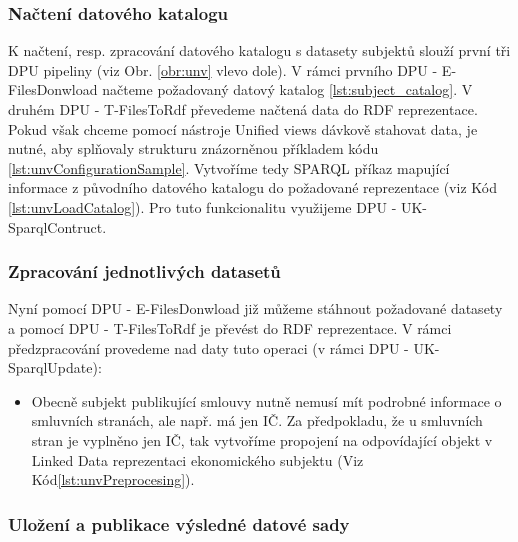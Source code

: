 \subsubsection*{Načtení datového katalogu}

K načtení, resp. zpracování datového katalogu s datasety subjektů slouží první tři DPU pipeliny (viz Obr. \ref{obr:unv} vlevo dole). V rámci prvního DPU - E-FilesDonwload načteme požadovaný datový katalog \ref{lst:subject_catalog}. V druhém DPU - T-FilesToRdf převedeme načtená data do RDF reprezentace. Pokud však chceme pomocí nástroje Unified views dávkově stahovat data, je nutné, aby splňovaly strukturu znázorněnou příkladem kódu \ref{lst:unvConfigurationSample}. Vytvoříme tedy SPARQL příkaz mapující informace z původního datového katalogu do požadované reprezentace (viz Kód \ref{lst:unvLoadCatalog}). Pro tuto funkcionalitu využijeme DPU - UK-SparqlContruct.





\subsubsection*{Zpracování jednotlivých datasetů}

Nyní pomocí DPU - E-FilesDonwload již můžeme stáhnout požadované datasety a pomocí DPU - T-FilesToRdf je převést do RDF reprezentace. V rámci předzpracování provedeme nad daty tuto operaci (v rámci DPU - UK-SparqlUpdate):

\begin{itemize}
\item Obecně subjekt publikující smlouvy nutně nemusí mít podrobné informace o smluvních stranách, ale např. má jen IČ. Za předpokladu, že u smluvních stran je vyplněno jen IČ, tak vytvoříme propojení na odpovídající objekt v Linked Data reprezentaci ekonomického subjektu (Viz Kód\ref{lst:unvPreprocesing}).  
\end{itemize}



\subsubsection*{Uložení a publikace výsledné datové sady}


